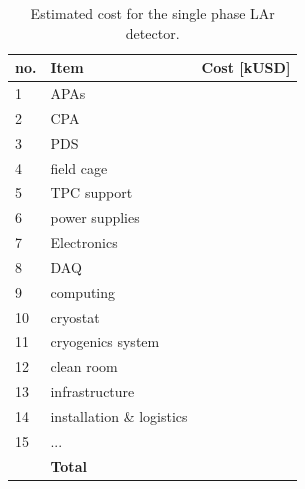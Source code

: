 \begin{table}[h!]
\centering
\begin{tabular}{| l| l| c |}
\hline
\textbf{no. } & \textbf{Item}  & \textbf{Cost [kUSD]}  \\ \hline
1 & APAs & \\
2 & CPA  & \\
3 & PDS  & \\
4 & field cage  & \\
5 & TPC support & \\
6 & power supplies & \\
7 & Electronics & \\
8 & DAQ & \\
9 & computing & \\
10 & cryostat &  \\   %
11 & cryogenics system &  \\  %
12 & clean room & \\
13 & infrastructure & \\
14 & installation \& logistics & \\
15 & ... & \\ \hline
  & \textbf{Total } & \\ \hline
\end{tabular}
\caption{Estimated cost for the single phase LAr detector.}
\label{tab:cost}
\end{table}











